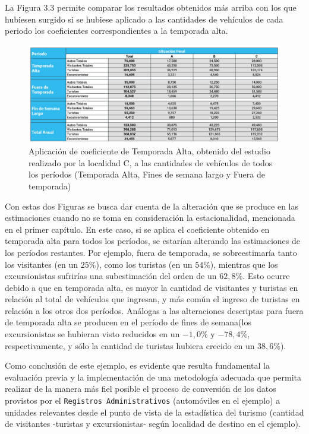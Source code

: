 \documentclass[
]{book}
\begin{document}
La Figura 3.3 permite comparar los resultados obtenidos más arriba con los que hubiesen surgido si se hubiese aplicado a las cantidades de vehículos de cada periodo los coeficientes correspondientes a la temporada alta.

\begin{figure}

{\centering \includegraphics[width=1\linewidth]{imagenes/figura5B} 

}

\caption{Aplicación de coeficiente de Temporada Alta, obtenido del estudio realizado por la localidad C, a las cantidades de vehículos de todos los períodos (Temporada Alta, Fines de semana largo y Fuera de temporada)}\label{fig:temporadaalta}
\end{figure}

\hfill\break
Con estas dos Figuras se busca dar cuenta de la alteración que se produce en las estimaciones cuando no se toma en consideración la estacionalidad, mencionada en el primer capítulo. En este caso, si se aplica el coeficiente obtenido en temporada alta para todos los períodos, se estarían alterando las estimaciones de los períodos restantes. Por ejemplo, fuera de temporada, se sobreestimaría tanto los visitantes (en un \(25\%\)), como los turistas (en un \(54\%\)), mientras que los excursionistas sufrirías una subestimación del orden de un \(62,8\%\). Esto ocurre debido a que en temporada alta, es mayor la cantidad de visitantes y turistas en relación al total de vehículos que ingresan, y más común el ingreso de turistas en relación a los otros dos períodos. Análogas a las alteraciones descriptas para fuera de temporada alta se producen en el período de fines de semana(los excursionistas se hubieran visto reducidos en un \(-1,0\%\) y \(-78,4\%\), respectivamente, y sólo la cantidad de turistas hubiera crecido en un \(38,6\%\)).

Como conclusión de este ejemplo, es evidente que resulta fundamental la evaluación previa y la implementación de una metodología adecuada que permita realizar de la manera más fiel posible el proceso de conversión de los datos provistos por el \texttt{Registros\ Administrativos} (automóviles en el ejemplo) a unidades relevantes desde el punto de vista de la estadística del turismo (cantidad de visitantes -turistas y excursionistas- según localidad de destino en el ejemplo).
\end{document}
